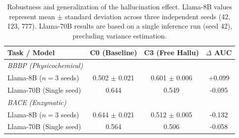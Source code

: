 \begin{table}[ht]
\centering
\caption{Robustness and generalization of the hallucination effect. Llama-8B values represent mean $\pm$ standard deviation across three independent seeds (42, 123, 777). Llama-70B results are based on a single inference run (seed 42), precluding variance estimation.}
\label{tab:robustness}
\begin{tabular}{lccc}
\toprule
\textbf{Task / Model} & \textbf{C0 (Baseline)} & \textbf{C3 (Free Hallu)} & \textbf{$\Delta$ AUC} \\ \midrule
\textit{BBBP (Physicochemical)} & & & \\
Llama-8B ($n=3$ seeds) & 0.502 $\pm$ 0.021 & 0.601 $\pm$ 0.006 & +0.099 \\
Llama-70B (Single seed) & 0.644 & 0.549 & -0.095 \\ \midrule
\textit{BACE (Enzymatic)} & & & \\
Llama-8B ($n=3$ seeds) & 0.644 $\pm$ 0.021 & 0.512 $\pm$ 0.005 & -0.132 \\
Llama-70B (Single seed) & 0.564 & 0.506 & -0.058 \\ \bottomrule
\end{tabular}
\end{table}
